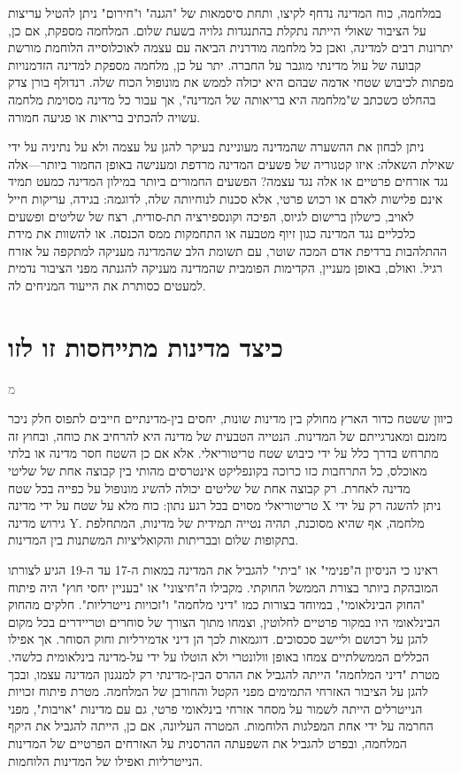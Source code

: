 \documentclass[12pt,oneside]{book}
\newcommand{\hebrewchapter}[2]{%
  \chapter*{#1}%
  \addcontentsline{toc}{chapter}{#1}%
  \lettrine[lines=4, lhang=0.1, loversize=0.5, findent=0pt]{\textcolor{gray} #2}{}%
}
\begin{document}
במלחמה, כוח המדינה נדחף לקיצו, ותחת סיסמאות של "הגנה" ו"חירום" ניתן להטיל עריצות על הציבור שאולי הייתה נתקלת בהתנגדות גלויה בשעת שלום. המלחמה מספקת, אם כן, יתרונות רבים למדינה, ואכן כל מלחמה מודרנית הביאה עם עצמה לאוכלוסייה הלוחמת מורשת קבועה של עול מדינתי מוגבר על החברה. יתר על כן, מלחמה מספקת למדינה הזדמנויות מפתות לכיבוש שטחי אדמה שבהם היא יכולה לממש את מונופול הכוח שלה. רנדולף בורן צדק בהחלט כשכתב ש"מלחמה היא בריאותה של המדינה", אך עבור כל מדינה מסוימת מלחמה עשויה להכתיב בריאות או פגיעה חמורה.

ניתן לבחון את ההשערה שהמדינה מעוניינת בעיקר להגן על עצמה ולא על נתיניה על ידי שאילת השאלה: איזו קטגוריה של פשעים המדינה מרדפת ומענישה באופן החמור ביותר—אלה נגד אזרחים פרטיים או אלה נגד עצמה? הפשעים החמורים ביותר במילון המדינה כמעט תמיד אינם פלישות לאדם או רכוש פרטי, אלא סכנות לנוחיותה שלה, לדוגמה: בגידה, עריקות חייל לאויב, כישלון ברישום לגיוס, הפיכה וקונספירציה תת-סודית, רצח של שליטים ופשעים כלכליים נגד המדינה כגון זיוף מטבעה או התחמקות ממס הכנסה. או להשוות את מידת ההתלהבות ברדיפת אדם המכה שוטר, עם תשומת הלב שהמדינה מעניקה למתקפה על אזרח רגיל. ואולם, באופן מעניין, הקדימות הפומבית שהמדינה מעניקה להגנתה מפני הציבור נדמית למעטים כסותרת את הייעוד המניחים לה.


\hebrewchapter{כיצד מדינות מתייחסות זו לזו}{מ}
כיוון ששטח כדור הארץ מחולק בין מדינות שונות, יחסים בין-מדינתיים חייבים לתפוס חלק ניכר מזמנם ומאנרגייתם של המדינות. הנטייה הטבעית של מדינה היא להרחיב את כוחה, ובחוץ זה מתרחש בדרך כלל על ידי כיבוש שטח טריטוריאלי. אלא אם כן השטח חסר מדינה או בלתי מאוכלס, כל התרחבות כזו כרוכה בקונפליקט אינטרסים מהותי בין קבוצה אחת של שליטי מדינה לאחרת. רק קבוצה אחת של שליטים יכולה להשיג מונופול על כפייה בכל שטח טריטוריאלי מסוים בכל רגע נתון: כוח מלא על שטח על ידי מדינה X ניתן להשגה רק על ידי גירוש מדינה Y. מלחמה, אף שהיא מסוכנת, תהיה נטייה תמידית של מדינות, המתחלפת בתקופות שלום ובבריתות והקואליציות המשתנות בין המדינות.

ראינו כי הניסיון ה"פנימי" או "ביתי" להגביל את המדינה במאות ה-17 עד ה-19 הגיע לצורתו המובהקת ביותר בצורת הממשל החוקתי. מקבילו ה"חיצוני" או "בעניין יחסי חוץ" היה פיתוח "החוק הבינלאומי", במיוחד בצורות כמו "דיני מלחמה" ו"זכויות נייטרליות". חלקים מהחוק הבינלאומי היו במקור פרטיים לחלוטין, וצמחו מתוך הצורך של סוחרים וטריידרים בכל מקום להגן על רכושם וליישב סכסוכים. דוגמאות לכך הן דיני אדמירליות וחוק הסוחר. אך אפילו הכללים הממשלתיים צמחו באופן וולונטרי ולא הוטלו על ידי על-מדינה בינלאומית כלשהי. מטרת "דיני המלחמה" הייתה להגביל את ההרס הבין-מדינתי רק למנגנון המדינה עצמו, ובכך להגן על הציבור האזרחי התמימים מפני הקטל והחורבן של המלחמה. מטרת פיתוח זכויות הנייטרלים הייתה לשמור על מסחר אזרחי בינלאומי פרטי, גם עם מדינות "אויבות", מפני החרמה על ידי אחת המפלגות הלוחמות. המטרה העליונה, אם כן, הייתה להגביל את היקף המלחמה, ובפרט להגביל את השפעתה ההרסנית על האזרחים הפרטיים של המדינות הנייטרליות ואפילו של המדינות הלוחמות.
\end{document}
